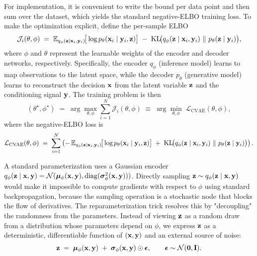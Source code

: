For implementation, it is convenient to write the bound per data point and then sum over the dataset, which yields the standard negative-ELBO training loss. To make the optimization explicit, define the per-sample ELBO
\[
  \mathcal{J}_i(\theta,\phi)
  \;=\;
  \mathbb{E}_{q_\phi(\vect{z}\mid\vect{x}_i,\vect{y}_i)}\!\big[\log p_\theta(\vect{x}_i\mid\vect{y}_i,\vect{z})\big]
  \;-\;
  \mathrm{KL}\!\big(q_\phi(\vect{z}\mid\vect{x}_i,\vect{y}_i)\ \|\ p_\theta(\vect{z}\mid\vect{y}_i)\big),
\]
where $\phi$ and $\theta$ represent the learnable weights of the encoder and decoder networks, respectively. Specifically, the encoder $q_\phi$ (inference model) learns to map observations to the latent space, while the decoder $p_\theta$ (generative model) learns to reconstruct the decision $\mathbf{x}$ from the latent variable $\mathbf{z}$ and the conditioning signal $\mathbf{y}$. The training problem is then
\begin{equation}
  (\theta^\star,\phi^\star)
  \;=\;
  \arg\max_{\theta,\phi}\sum_{i=1}^{N}\mathcal{J}_i(\theta,\phi)
  \;\equiv\;
  \arg\min_{\theta,\phi}\;\mathcal{L}_{\mathrm{CVAE}}(\theta,\phi),
  \label{eq:cvae_opt_problem}
\end{equation}
where the negative-ELBO loss is
\begin{equation}
  \mathcal{L}_{\mathrm{CVAE}}(\theta,\phi)
  \;=\;
  \sum_{i=1}^{N}
  \left(
    -\,\mathbb{E}_{q_\phi(\vect{z}\mid\vect{x}_i,\vect{y}_i)}\!\big[\log p_\theta(\vect{x}_i\mid\vect{y}_i,\vect{z})\big]
    \;+\;
    \mathrm{KL}\!\big(q_\phi(\vect{z}\mid\vect{x}_i,\vect{y}_i)\ \|\ p_\theta(\vect{z}\mid\vect{y}_i)\big)
  \right).
  \label{eq:cvae_loss}
\end{equation}

A standard parameterization uses a Gaussian encoder
$q_\phi(\mathbf{z}\mid\mathbf{x},\mathbf{y})=\mathcal{N}(\boldsymbol{\mu}_\phi(\mathbf{x},\mathbf{y}),\mathrm{diag}(\boldsymbol{\sigma}^2_\phi(\mathbf{x},\mathbf{y})))$.
Directly sampling $\mathbf{z}\sim q_\phi(\mathbf{z}\mid\mathbf{x},\mathbf{y})$ would make it impossible to compute gradients with respect to $\phi$ using standard backpropagation, because the sampling operation is a stochastic node that blocks the flow of derivatives. The reparameterization trick resolves this by "decoupling" the randomness from the parameters. Instead of viewing $\mathbf{z}$ as a random draw from a distribution whose parameters depend on $\phi$, we express $\mathbf{z}$ as a deterministic, differentiable function of $(\mathbf{x},\mathbf{y})$ and an external source of noise:
\[
  \mathbf{z}
  \;=\;
  \boldsymbol{\mu}_\phi(\mathbf{x},\mathbf{y})
  \;+\;
  \boldsymbol{\sigma}_\phi(\mathbf{x},\mathbf{y})\odot \boldsymbol{\epsilon},
  \qquad
  \boldsymbol{\epsilon}\sim\mathcal{N}(\mathbf{0},\mathbf{I}).
\]

